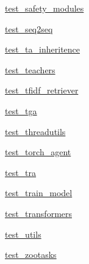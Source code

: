 \begin{DoxyCompactItemize}
 \hyperlink{namespacetests_1_1test__safety__modules}{test\+\_\+safety\+\_\+modules}
\item 
 \hyperlink{namespacetests_1_1test__seq2seq}{test\+\_\+seq2seq}
\item 
 \hyperlink{namespacetests_1_1test__ta__inheritence}{test\+\_\+ta\+\_\+inheritence}
\item 
 \hyperlink{namespacetests_1_1test__teachers}{test\+\_\+teachers}
\item 
 \hyperlink{namespacetests_1_1test__tfidf__retriever}{test\+\_\+tfidf\+\_\+retriever}
\item 
 \hyperlink{namespacetests_1_1test__tga}{test\+\_\+tga}
\item 
 \hyperlink{namespacetests_1_1test__threadutils}{test\+\_\+threadutils}
\item 
 \hyperlink{namespacetests_1_1test__torch__agent}{test\+\_\+torch\+\_\+agent}
\item 
 \hyperlink{namespacetests_1_1test__tra}{test\+\_\+tra}
\item 
 \hyperlink{namespacetests_1_1test__train__model}{test\+\_\+train\+\_\+model}
\item 
 \hyperlink{namespacetests_1_1test__transformers}{test\+\_\+transformers}
\item 
 \hyperlink{namespacetests_1_1test__utils}{test\+\_\+utils}
\item 
 \hyperlink{namespacetests_1_1test__zootasks}{test\+\_\+zootasks}
\end{DoxyCompactItemize}
